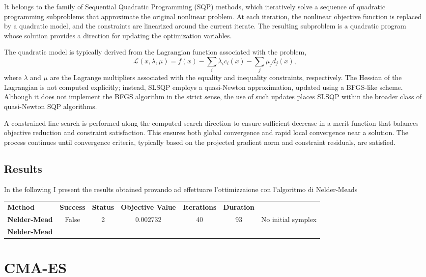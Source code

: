 It belongs to the family of Sequential Quadratic Programming (SQP) methods, which iteratively solve a sequence of quadratic programming subproblems that approximate the original nonlinear problem. 
At each iteration, the nonlinear objective function is replaced by a quadratic model, and the constraints are linearized around the current iterate. 
The resulting subproblem is a quadratic program whose solution provides a direction for updating the optimization variables.

The quadratic model is typically derived from the Lagrangian function associated with the problem,
\begin{equation}
\mathcal{L}(x, \lambda, \mu) = f(x) - \sum_{i} \lambda_i c_i(x) - \sum_{j} \mu_j d_j(x),
\end{equation}
where $ \lambda $ and $ \mu $ are the Lagrange multipliers associated with the equality and inequality constraints, respectively. 
The Hessian of the Lagrangian is not computed explicitly; instead, SLSQP employs a quasi-Newton approximation, updated using a BFGS-like scheme. 
Although it does not implement the BFGS algorithm in the strict sense, the use of such updates places SLSQP within the broader class of quasi-Newton SQP algorithms.

A constrained line search is performed along the computed search direction to ensure sufficient decrease in a merit function that balances objective reduction and constraint satisfaction. 
This ensures both global convergence and rapid local convergence near a solution. 
The process continues until convergence criteria, typically based on the projected gradient norm and constraint residuals, are satisfied.

\subsection{Results}
In the following I present the results obtained provando ad effettuare l'ottimizzaione con l'algoritmo di Nelder-Meads

\begin{tabular}{lcccccc}
    \textbf{Method} & \textbf{Success} & \textbf{Status} & \textbf{Objective Value} & \textbf{Iterations} & \textbf{Duration}\\
    \textbf{Nelder-Mead} & False & 2 & 0.002732 & 40 & 93 & No initial symplex\\
    \textbf{Nelder-Mead}
\end{tabular}

\section{CMA-ES}


